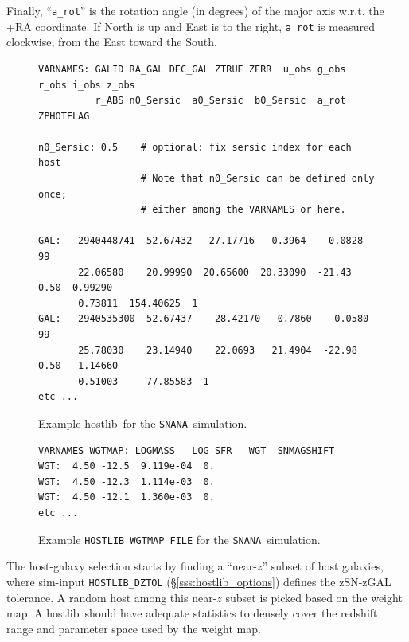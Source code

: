 \documentclass[12pt]{article}
\newcommand{\snana}{{\tt SNANA}}
\newcommand{\hostlib}{{\sc hostlib}}
\begin{document}
{Finally, ``{\tt a\_rot}'' 
is the rotation angle (in degrees) of the major axis  w.r.t. 
the +RA coordinate.  If North is up and East is to the right, 
{\tt a\_rot} is measured clockwise, from the East toward the South.



\begin{figure}[!] 
\begin{center}
\caption{  Example \hostlib\ for the \snana\ simulation. }
\label{fig:hostlib}
\begin{Verbatim}[frame=single]
VARNAMES: GALID RA_GAL DEC_GAL ZTRUE ZERR  u_obs g_obs r_obs i_obs z_obs
          r_ABS n0_Sersic  a0_Sersic  b0_Sersic  a_rot  ZPHOTFLAG

n0_Sersic: 0.5    # optional: fix sersic index for each host
                  # Note that n0_Sersic can be defined only once;
                  # either among the VARNAMES or here.

GAL:   2940448741  52.67432  -27.17716   0.3964    0.0828    99  
       22.06580    20.99990  20.65600  20.33090  -21.43 0.50  0.99290  
       0.73811  154.40625  1
GAL:   2940535300  52.67437   -28.42170   0.7860    0.0580    99    
       25.78030    23.14940    22.0693   21.4904  -22.98 0.50   1.14660  
       0.51003     77.85583  1
etc ...
\end{Verbatim}
\end{center}
\end{figure}


\begin{figure}[!] 
\begin{center}
\caption{  Example {\tt HOSTLIB\_WGTMAP\_FILE} for the \snana\ simulation. }
\label{fig:hostlib_wgtmap}
\begin{Verbatim}[frame=single]
VARNAMES_WGTMAP: LOGMASS   LOG_SFR   WGT  SNMAGSHIFT
WGT:  4.50 -12.5  9.119e-04  0.
WGT:  4.50 -12.3  1.114e-03  0.
WGT:  4.50 -12.1  1.360e-03  0.
etc ...
\end{Verbatim}
\end{center}
\end{figure}

The host-galaxy selection starts by finding a ``near-$z$''
subset of host galaxies, where sim-input {\tt HOSTLIB\_DZTOL} 
(\S\ref{sss:hostlib_options})
defines the zSN-zGAL tolerance.
A random host among this near-$z$ subset is 
picked based on the weight map.
A \hostlib\ should have adequate statistics to densely
cover the redshift range and parameter space used by
the weight map.


}
\end{document}
